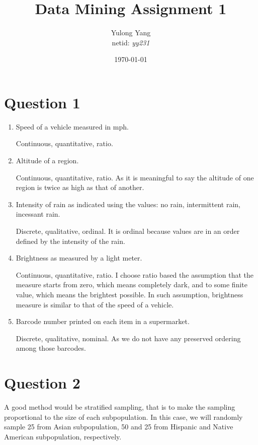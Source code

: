 \documentclass[paper=a4, fontsize=11pt]{scrartcl} %
\title{Data Mining Assignment 1}
\author{Yulong Yang\\ netid: \textit{yy231}} %
\date{\normalsize\today} %
\begin{document}
\maketitle %

\section*{Question 1}

\begin{enumerate}
\item Speed of a vehicle measured in mph.

Continuous, quantitative, ratio. 

\item Altitude of a region.

Continuous, quantitative, ratio. As it is meaningful to say the altitude of one region is twice as high as that of another.

\item Intensity of rain as indicated using the values: no rain, intermittent rain, incessant rain. 

Discrete, qualitative, ordinal. It is ordinal because values are in an order defined by the intensity of the rain.

\item Brightness as measured by a light meter.

Continuous, quantitative, ratio. I choose ratio based the assumption that the measure starts from zero, which means completely dark, and to some finite value, which means the brightest possible. In such assumption, brightness measure is similar to that of the speed of a vehicle. 

\item Barcode number printed on each item in a supermarket.

Discrete, qualitative, nominal. As we do not have any preserved ordering among those barcodes.

\end{enumerate}

\section*{Question 2}

A good method would be stratified sampling, that is to make the sampling proportional to the size of each subpopulation. In this case, we will randomly sample 25 from Asian subpopulation, 50 and 25 from Hispanic and Native American subpopulation, respectively.
\end{document}
